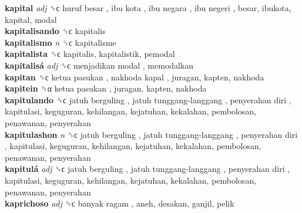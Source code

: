 \textbf{kapital} \emph{adj}  ␝ϲ   huruf besar ,  ibu kota ,  ibu negara ,  ibu negeri , besar, ibukota, kapital, modal  \\
\textbf{kapitalisando} ␝ϲ  kapitalis  \\
\textbf{kapitalismo} \emph{n}  ␝ϲ  kapitalisme  \\
\textbf{kapitalista} ␝ϲ  kapitalis, kapitalistik, pemodal  \\
\textbf{kapitalisá} \emph{adj}  ␝ϲ   menjadikan modal , memodalkan  \\
\textbf{kapitan} ␝ϲ   ketua pasukan ,  nakhoda kapal , juragan, kapten, nakhoda  \\
\textbf{kapitein} ␝α   ketua pasukan , juragan, kapten, nakhoda  \\
\textbf{kapitulando} ␝ϲ   jatuh berguling ,  jatuh tunggang-langgang ,  penyerahan diri , kapitulasi, keguguran, kehilangan, kejatuhan, kekalahan, pembolosan, penawanan, penyerahan  \\
\textbf{kapitulashon} \emph{n}  ␝ϲ   jatuh berguling ,  jatuh tunggang-langgang ,  penyerahan diri , kapitulasi, keguguran, kehilangan, kejatuhan, kekalahan, pembolosan, penawanan, penyerahan  \\
\textbf{kapitulá} \emph{adj}  ␝ϲ   jatuh berguling ,  jatuh tunggang-langgang ,  penyerahan diri , kapitulasi, keguguran, kehilangan, kejatuhan, kekalahan, pembolosan, penawanan, penyerahan  \\
\textbf{kaprichoso} \emph{adj}  ␝ϲ   banyak ragam , aneh, desakan, ganjil, pelik  \\
